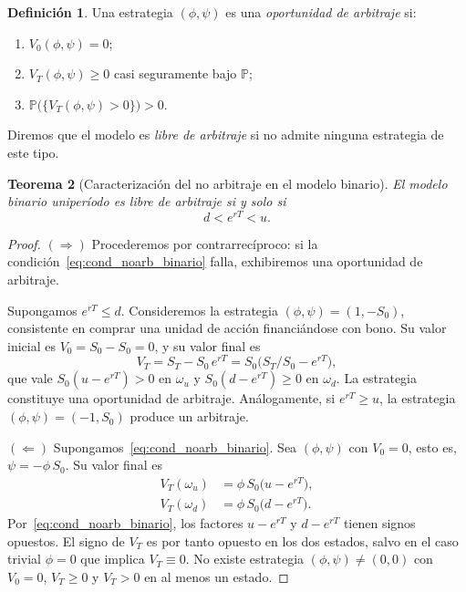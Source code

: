 \documentclass[11pt,a4paper,oneside]{report}
\theoremstyle{plain}
\newtheorem{teorema}{Teorema}[chapter]
\theoremstyle{definition}
\newtheorem{definicion}[teorema]{Definición}
\theoremstyle{remark}
\newcommand{\PP}{\mathbb{P}}
\newcommand{\1}{\mathbf{1}}
\begin{document}
\begin{definicion}
\label{def:arbitraje}
Una estrategia $(\phi, \psi)$ es una \emph{oportunidad de arbitraje} si:
\begin{enumerate}[label=\textnormal{(\roman*)}]
  \item $V_0(\phi, \psi) = 0$;
  \item $V_T(\phi, \psi) \geq 0$ casi seguramente bajo $\PP$;
  \item $\PP\bigl(\{V_T(\phi, \psi) > 0\}\bigr) > 0$.
\end{enumerate}
Diremos que el modelo es \emph{libre de arbitraje} si no admite ninguna
estrategia de este tipo.
\end{definicion}

\medskip

\begin{teorema}[Caracterización del no arbitraje en el modelo binario]
\label{teo:noarb_binario}
El modelo binario uniperíodo es libre de arbitraje si y solo si
\begin{equation}\label{eq:cond_noarb_binario}
  d < e^{rT} < u.
\end{equation}
\end{teorema}

\begin{proof}
$(\Rightarrow)$ Procederemos por contrarrecíproco: si la
condición~\eqref{eq:cond_noarb_binario} falla, exhibiremos una
oportunidad de arbitraje.

Supongamos $e^{rT} \leq d$. Consideremos la estrategia $(\phi, \psi) =
(1, -S_0)$, consistente en comprar una unidad de acción financiándose
con bono. Su valor inicial es $V_0 = S_0 - S_0 = 0$, y su valor final
es
\begin{equation*}
  V_T = S_T - S_0\, e^{rT} = S_0\bigl(S_T/S_0 - e^{rT}\bigr),
\end{equation*}
que vale $S_0(u - e^{rT}) > 0$ en $\omega_u$ y $S_0(d - e^{rT}) \geq 0$
en $\omega_d$. La estrategia constituye una oportunidad de arbitraje.
Análogamente, si $e^{rT} \geq u$, la estrategia $(\phi, \psi) = (-1,
S_0)$ produce un arbitraje.

$(\Leftarrow)$ Supongamos~\eqref{eq:cond_noarb_binario}. Sea $(\phi,
\psi)$ con $V_0 = 0$, esto es, $\psi = -\phi\, S_0$. Su valor final es
\begin{align*}
  V_T(\omega_u) &= \phi\, S_0\bigl(u - e^{rT}\bigr), \\
  V_T(\omega_d) &= \phi\, S_0\bigl(d - e^{rT}\bigr).
\end{align*}
Por~\eqref{eq:cond_noarb_binario}, los factores $u - e^{rT}$ y $d -
e^{rT}$ tienen signos opuestos. El signo de $V_T$ es por tanto opuesto
en los dos estados, salvo en el caso trivial $\phi = 0$ que implica
$V_T \equiv 0$. No existe estrategia $(\phi, \psi) \neq (0, 0)$ con
$V_0 = 0$, $V_T \geq 0$ y $V_T > 0$ en al menos un estado.
\end{proof}
\end{document}
